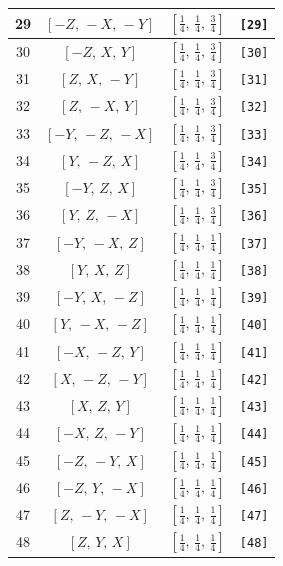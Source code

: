 \documentclass[fleqn,8pt]{jsarticle}
\begin{document}
\begin{longtable}{cccc}
29 & $\left[ - Z,\, - X,\, - Y \right]$ & $\left[ \frac{1}{4},\, \frac{1}{4},\, \frac{3}{4} \right]$ & {\tt [29]} \\ \hline
30 & $\left[ - Z,\, X,\, Y \right]$ & $\left[ \frac{1}{4},\, \frac{1}{4},\, \frac{3}{4} \right]$ & {\tt [30]} \\ \hline
31 & $\left[ Z,\, X,\, - Y \right]$ & $\left[ \frac{1}{4},\, \frac{1}{4},\, \frac{3}{4} \right]$ & {\tt [31]} \\ \hline
32 & $\left[ Z,\, - X,\, Y \right]$ & $\left[ \frac{1}{4},\, \frac{1}{4},\, \frac{3}{4} \right]$ & {\tt [32]} \\ \hline
33 & $\left[ - Y,\, - Z,\, - X \right]$ & $\left[ \frac{1}{4},\, \frac{1}{4},\, \frac{3}{4} \right]$ & {\tt [33]} \\ \hline
34 & $\left[ Y,\, - Z,\, X \right]$ & $\left[ \frac{1}{4},\, \frac{1}{4},\, \frac{3}{4} \right]$ & {\tt [34]} \\ \hline
35 & $\left[ - Y,\, Z,\, X \right]$ & $\left[ \frac{1}{4},\, \frac{1}{4},\, \frac{3}{4} \right]$ & {\tt [35]} \\ \hline
36 & $\left[ Y,\, Z,\, - X \right]$ & $\left[ \frac{1}{4},\, \frac{1}{4},\, \frac{3}{4} \right]$ & {\tt [36]} \\ \hline
37 & $\left[ - Y,\, - X,\, Z \right]$ & $\left[ \frac{1}{4},\, \frac{1}{4},\, \frac{1}{4} \right]$ & {\tt [37]} \\ \hline
38 & $\left[ Y,\, X,\, Z \right]$ & $\left[ \frac{1}{4},\, \frac{1}{4},\, \frac{1}{4} \right]$ & {\tt [38]} \\ \hline
39 & $\left[ - Y,\, X,\, - Z \right]$ & $\left[ \frac{1}{4},\, \frac{1}{4},\, \frac{1}{4} \right]$ & {\tt [39]} \\ \hline
40 & $\left[ Y,\, - X,\, - Z \right]$ & $\left[ \frac{1}{4},\, \frac{1}{4},\, \frac{1}{4} \right]$ & {\tt [40]} \\ \hline
41 & $\left[ - X,\, - Z,\, Y \right]$ & $\left[ \frac{1}{4},\, \frac{1}{4},\, \frac{1}{4} \right]$ & {\tt [41]} \\ \hline
42 & $\left[ X,\, - Z,\, - Y \right]$ & $\left[ \frac{1}{4},\, \frac{1}{4},\, \frac{1}{4} \right]$ & {\tt [42]} \\ \hline
43 & $\left[ X,\, Z,\, Y \right]$ & $\left[ \frac{1}{4},\, \frac{1}{4},\, \frac{1}{4} \right]$ & {\tt [43]} \\ \hline
44 & $\left[ - X,\, Z,\, - Y \right]$ & $\left[ \frac{1}{4},\, \frac{1}{4},\, \frac{1}{4} \right]$ & {\tt [44]} \\ \hline
45 & $\left[ - Z,\, - Y,\, X \right]$ & $\left[ \frac{1}{4},\, \frac{1}{4},\, \frac{1}{4} \right]$ & {\tt [45]} \\ \hline
46 & $\left[ - Z,\, Y,\, - X \right]$ & $\left[ \frac{1}{4},\, \frac{1}{4},\, \frac{1}{4} \right]$ & {\tt [46]} \\ \hline
47 & $\left[ Z,\, - Y,\, - X \right]$ & $\left[ \frac{1}{4},\, \frac{1}{4},\, \frac{1}{4} \right]$ & {\tt [47]} \\ \hline
48 & $\left[ Z,\, Y,\, X \right]$ & $\left[ \frac{1}{4},\, \frac{1}{4},\, \frac{1}{4} \right]$ & {\tt [48]} \\
\end{longtable}
\end{document}
